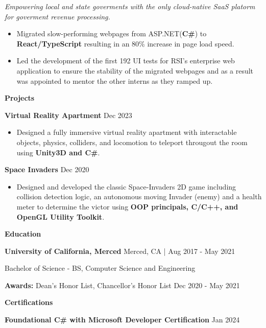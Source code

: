 \documentclass[10pt]{article}
\begin{document}
\textit{Empowering local and state goverments with the only cloud-native SaaS platorm for goverment revenue processing.}

\vspace{1pt}

\begin{itemize}[noitemsep]
    \item Migrated slow-performing webpages from ASP.NET(\textbf{C\#}) to \textbf{React/TypeScript} resulting in an 80\% increase in page load speed.
    \item Led the development of the first 192 UI tests for RSI's enterprise web application to ensure the stability of the migrated webpages and as a result was appointed to mentor the other interns as they ramped up.
\end{itemize}



\begin{center}
    \textbf{Projects}
    \hrulefill
\end{center}

\textbf{Virtual Reality Apartment} \hfill Dec 2023
\begin{itemize}
    \item Designed a fully immersive virtual reality apartment with interactable objects, physics, colliders,
    and locomotion to teleport througout the room using \textbf{Unity3D and C\#}.
\end{itemize}

\textbf{Space Invaders} \hfill Dec 2020
\begin{itemize}
    \item Designed and developed the classic Space-Invaders 2D game including collision detection logic, 
    an autonomous moving Invader (enemy) and a health meter to determine the victor using \textbf{OOP principals, C/C++, and OpenGL Utility Toolkit}.
\end{itemize}


\begin{center}
    \textbf{Education}
    \hrulefill
\end{center}
\textbf{University of California, Merced} \hfill Merced, CA | Aug 2017 - May 2021

Bachelor of Science - BS, Computer Science and Engineering 

\textbf{Awards:} Dean's Honor List, Chancellor's Honor List \hfill Dec 2020 - May 2021

\begin{center}
    \textbf{Certifications}
    \hrulefill
\end{center}
\textbf{Foundational C\# with Microsoft Developer Certification} \hfill Jan 2024
\end{document}
